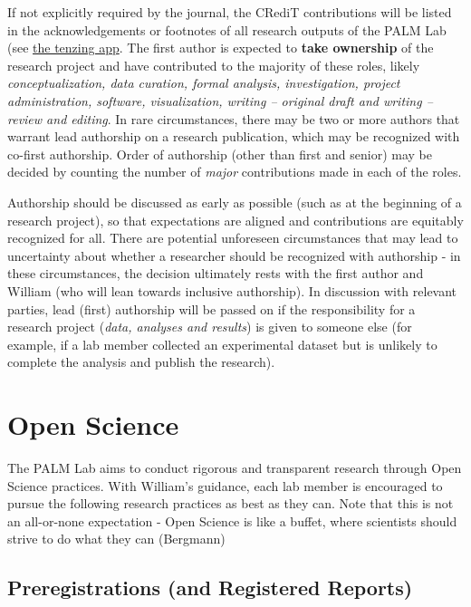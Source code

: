 \documentclass[
]{book}
\theoremstyle{definition}
\theoremstyle{definition}
\theoremstyle{definition}
\theoremstyle{definition}
\theoremstyle{remark}
\begin{document}
If not explicitly required by the journal, the CRediT contributions will be listed in the acknowledgements or footnotes of all research outputs of the PALM Lab (see \protect\hyperlink{tenzing}{the tenzing app}. The first author is expected to \textbf{take ownership} of the research project and have contributed to the majority of these roles, likely \emph{conceptualization, data curation, formal analysis, investigation, project administration, software, visualization, writing -- original draft and writing -- review and editing}. In rare circumstances, there may be two or more authors that warrant lead authorship on a research publication, which may be recognized with co-first authorship. Order of authorship (other than first and senior) may be decided by counting the number of \emph{major} contributions made in each of the roles.

Authorship should be discussed as early as possible (such as at the beginning of a research project), so that expectations are aligned and contributions are equitably recognized for all. There are potential unforeseen circumstances that may lead to uncertainty about whether a researcher should be recognized with authorship - in these circumstances, the decision ultimately rests with the first author and William (who will lean towards inclusive authorship). In discussion with relevant parties, lead (first) authorship will be passed on if the responsibility for a research project (\emph{data, analyses and results}) is given to someone else (for example, if a lab member collected an experimental dataset but is unlikely to complete the analysis and publish the research).

\hypertarget{open-science}{%
\section{Open Science}\label{open-science}}

The PALM Lab aims to conduct rigorous and transparent research through Open Science practices. With William's guidance, each lab member is encouraged to pursue the following research practices as best as they can. Note that this is not an all-or-none expectation - Open Science is like a buffet, where scientists should strive to do what they can (Bergmann)

\hypertarget{preregistrations-and-registered-reports}{%
\subsection{Preregistrations (and Registered Reports)}\label{preregistrations-and-registered-reports}}
\end{document}
